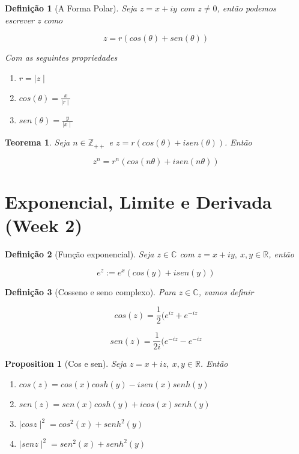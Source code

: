 \documentclass{article}
\newtheorem{prop}{Proposition}
\newtheorem{theorem}{Teorema}
\newtheorem{definition}{Definição}
\begin{document}
\begin{definition}[A Forma Polar]
Seja $z = x + iy$ com $z \neq 0$, então podemos escrever z como

$$z = r(cos(\theta) + sen(\theta))$$

Com as seguintes propriedades

\begin{enumerate}
    \item $r = \mid z \mid $
    
    \item $cos(\theta) = \frac{x}{\mid r \mid}$
    
    \item $sen(\theta) = \frac{y}{\mid x \mid}$
\end{enumerate}
\end{definition}

\begin{theorem}
Seja $n \in \mathbb{Z}_{++}$ e $z = r(cos(\theta) + i sen(\theta))$. Então

$$z^n = r^n (cos(n\theta) + i sen(n\theta))$$
\end{theorem}

\section*{Exponencial, Limite e Derivada (Week 2)}
\label{s2}
\begin{definition}[Função exponencial]
Seja $z \in \mathbb{C}$ com $z = x + iy,\ x,y \in \mathbb{R}$, então 

$$e^z := e^x(cos(y) + i sen(y))$$
\end{definition}

\begin{definition}[Cosseno e seno complexo]
Para $z \in \mathbb{C}$, vamos definir

$$cos(z) = \frac{1}{2}(e^{iz} + e^{- iz}$$

$$sen(z) = \frac{1}{2 i}(e^{- iz} - e^{- iz}$$
\end{definition}


\begin{prop}[Cos e sen]
Seja $z = x + iz,\ x, y \in \mathbb{R}$. Então

\begin{enumerate}[label=(\alph*)]
    \item $cos(z) = cos(x) cosh(y) - i sen(x) senh(y)$
    
    \item $sen(z) = sen(x) cosh(y) + i cos(x) senh(y)$
    
    \item $\mid cos z \mid^2 = cos^2(x) + senh^2(y)$
    
    \item $\mid sen z \mid^2 = sen^2(x) + senh^2(y)$
\end{enumerate}
\end{prop}
\end{document}
